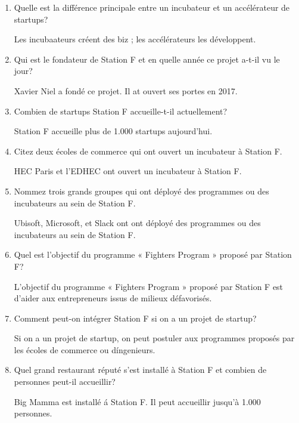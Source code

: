 \documentclass{article}
\begin{document}
\begin{enumerate}
	\item Quelle est la différence principale entre un incubateur et un
	      accélérateur de startups?

	      Les incubaateurs créent des biz ; les accélérateurs les développent.

	\item Qui est le fondateur de Station F et en quelle année ce projet a-t-il
	      vu le jour?

	      Xavier Niel a fondé ce projet. Il at ouvert ses portes en 2017.

	\item Combien de startups Station F accueille-t-il actuellement?

	      Station F accueille plus de 1.000 startups aujourd'hui.

	\item Citez deux écoles de commerce qui ont ouvert un incubateur à Station
	      F.

	      HEC Paris et l'EDHEC ont ouvert un incubateur à Station F.

	\item Nommez trois grands groupes qui ont déployé des programmes ou des
	      incubateurs au sein de Station F.

	      Ubisoft, Microsoft, et Slack ont ont déployé des programmes ou des
	      incubateurs au sein de Station F.

	\item Quel est l'objectif du programme « Fighters Program » proposé par
	      Station F?

	      L'objectif du programme « Fighters Program » proposé par Station F
	      est d'aider aux entrepreneurs issus de milieux défavorisés.

	\item Comment peut-on intégrer Station F si on a un projet de startup?

	      Si on a un projet de startup, on peut postuler aux programmes
	      proposés par les écoles de commerce ou díngenieurs.

	\item Quel grand restaurant réputé s’est installé à Station F et combien de
	      personnes peut-il accueillir?

	      Big Mamma est installé á Station F. Il peut accueillir jusqu'à 1.000
	      personnes.

\end{enumerate}
\end{document}
